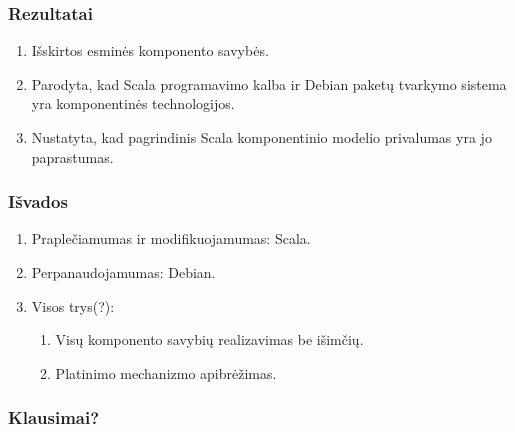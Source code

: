 \begin{frame}
  \frametitle{Rezultatai}
  \begin{enumerate}
    \item Išskirtos esminės komponento savybės.
    \item Parodyta, kad Scala programavimo kalba ir Debian paketų
      tvarkymo sistema yra komponentinės technologijos.
    \item Nustatyta, kad pagrindinis Scala komponentinio modelio
      privalumas yra jo paprastumas.
  \end{enumerate}
\end{frame}

\begin{frame}
  \frametitle{Išvados}
  \begin{enumerate}
    \item Praplečiamumas ir modifikuojamumas: Scala.
    \item Perpanaudojamumas: Debian.
    \item Visos trys(?):
      \begin{enumerate}
        \item Visų komponento savybių realizavimas be išimčių.
        \item Platinimo mechanizmo apibrėžimas.
      \end{enumerate}
  \end{enumerate}
\end{frame}

\begin{frame}
  \frametitle{Klausimai?}
\end{frame}
